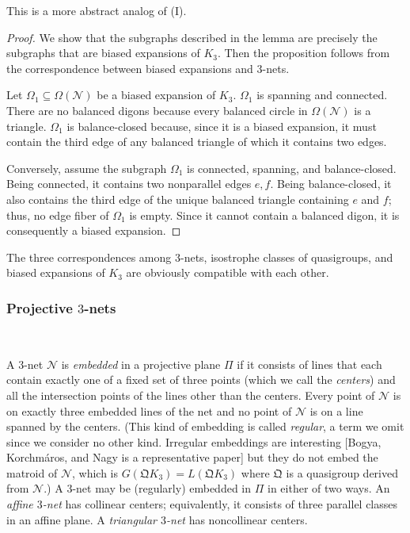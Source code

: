 \documentclass[reqno,12pt]{amsart}
\theoremstyle{remark}
\numberwithin{equation}{section}
\numberwithin{figure}{section}
\newcommand \cN{\mathcal{N}}
\newcommand \fQ{\mathfrak Q}
\newcommand\PP{\Pi}	%
\begin{document}
This is a more abstract analog of \cite[Corollary 2.4]{BG6}(I).  %

\begin{proof}  
We show that the subgraphs described in the lemma are precisely the subgraphs that are biased expansions of $K_3$.  Then the proposition follows from the correspondence between biased expansions and $3$-nets.

Let $\Omega_1 \subseteq \Omega(\cN)$ be a biased expansion of $K_3$.  $\Omega_1$ is spanning and connected.  There are no balanced digons because every balanced circle in $\Omega(\cN)$ is a triangle.  $\Omega_1$ is balance-closed because, since it is a biased expansion, it must contain the third edge of any balanced triangle of which it contains two edges.

Conversely, assume the subgraph $\Omega_1$ is connected, spanning, and balance-closed.  Being connected, it contains two nonparallel edges $e, f$.  Being balance-closed, it also contains the third edge of the unique balanced triangle containing $e$ and $f$; thus, no edge fiber of $\Omega_1$ is empty.  Since it cannot contain a balanced digon, it is consequently a biased expansion.
\end{proof}

The three correspondences among $3$-nets, isostrophe classes of quasigroups, and biased expansions of $K_3$ are obviously compatible with each other.

\subsubsection{Projective $3$-nets}\label{projnets}\

A $3$-net $\cN$ is \emph{embedded} in a projective plane $\PP$ if it consists of lines that each contain exactly one of a fixed set of three points (which we call the \emph{centers}) and all the intersection points of the lines other than the centers.  Every point of $\cN$ is on exactly three embedded lines of the net and no point of $\cN$ is on a line spanned by the centers.  (This kind of embedding is called \emph{regular}, a term we omit since we consider no other kind.  Irregular embeddings are interesting [Bogya, Korchm\'aros, and Nagy \cite{Nagy} is a representative paper] but they do not embed the matroid of $\cN$, which is $G(\fQ K_3)=L(\fQ K_3)$ where $\fQ$ is a quasigroup derived from $\cN$.)  
A $3$-net may be (regularly) embedded in $\PP$ in either of two ways.  An \emph{affine $3$-net} has collinear centers; equivalently, it consists of three parallel classes in an affine plane.  A \emph{triangular $3$-net} has noncollinear centers.  
\end{document}
